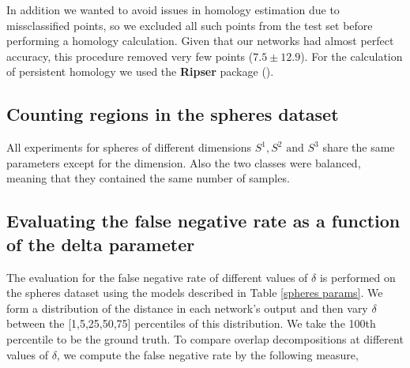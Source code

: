 \documentclass[10pt]{article} %
\theoremstyle{plain}
\theoremstyle{definition}
\theoremstyle{remark}
\begin{document}
In addition we wanted to avoid issues in homology estimation due to missclassified points, so we excluded all such points from the test set before performing a homology calculation. Given that our networks had almost perfect accuracy, this procedure removed very few points ($7.5 \pm 12.9$). For the calculation of persistent homology we used the \textbf{Ripser} package (\cite{ctralie2018ripser, Bauer2021Ripser}).


\subsection{Counting regions in the spheres dataset}
All experiments for spheres of different dimensions $S^1, S^2 \text{ and } S^3$ share the same parameters except for the dimension. Also the two classes were balanced, meaning that they contained the same number of samples. 


\begin{table}[ht]
\caption{Parameters for spheres datasets}
\label{spheres params}
\vskip 0.15in
\begin{center}
\begin{small}
\begin{sc}
\end{sc}
\end{small}
\end{center}
\vskip -0.1in
\end{table}

\subsection{Evaluating the false negative rate as a function of the delta parameter}

{The evaluation for the false negative rate of different values of $\delta$ is performed on the spheres dataset using the models described in Table \ref{spheres params}. We form a distribution of the distance in each network's output and then vary $\delta$ between the [1,5,25,50,75] percentiles of this distribution. We take the 100th percentile to be the ground truth. To compare overlap decompositions at different values of $\delta$, we compute the false negative rate by the following measure,}
\end{document}
